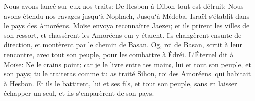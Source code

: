 \verse Nous avons lancé sur eux nos traits: De Hesbon à Dibon tout est détruit; Nous avons étendu nos ravages jusqu`à Nophach, Jusqu`à Médeba. 
\verse Israël s`établit dans le pays des Amoréens. 
\verse Moïse envoya reconnaître Jaezer; et ils prirent les villes de son ressort, et chassèrent les Amoréens qui y étaient. 
\verse Ils changèrent ensuite de direction, et montèrent par le chemin de Basan. Og, roi de Basan, sortit à leur rencontre, avec tout son peuple, pour les combattre à Édréi. 
\verse L`Éternel dit à Moïse: Ne le crains point; car je le livre entre tes mains, lui et tout son peuple, et son pays; tu le traiteras comme tu as traité Sihon, roi des Amoréens, qui habitait à Hesbon. 
\verse Et ils le battirent, lui et ses fils, et tout son peuple, sans en laisser échapper un seul, et ils s`emparèrent de son pays. 

